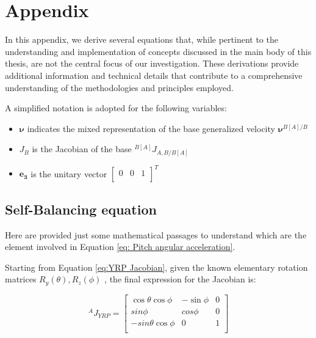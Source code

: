 \chapter{Appendix}
\label{ch:Appendix}%

In this appendix, we derive several equations that, while pertinent to the understanding and implementation of concepts discussed in the main body of this thesis, are not the central focus of our investigation. These derivations provide additional information and technical details that contribute to a comprehensive understanding of the methodologies and principles employed.

A simplified notation is adopted for the following variables:

\begin{itemize}
    \item $\bm{\nu}$ indicates the mixed representation of the base generalized velocity $\bm{\nu}^{B[A]/B}$
    \item $J_{B}$ is the Jacobian of the base ${}^{B[A]} J_{A,B/B[A]}$
    \item $\mathbf{e_{3}}$ is the unitary vector $\begin{bmatrix}
        0 & 0 & 1 \\
    \end{bmatrix}^{T}$
\end{itemize}

\section{Self-Balancing equation}
\label{sec:Self-Balancing equation}

Here are provided just some mathematical passages to understand which are the element involved in Equation \eqref{eq: Pitch angular acceleration}.

Starting from Equation \eqref{eq:YRP Jacobian}, given the known elementary rotation matrices $R_{y}(\theta),R_{z}(\phi)$ \cite{Siciliano-et-al}, the final expression for the Jacobian is:

\begin{equation}
    {}^{A}J_{YRP} = \begin{bmatrix}
        \cos{\theta}\cos{\phi} & -\sin{\phi} & 0 \\
        sin{\phi} & cos{\phi} & 0 \\
        -sin{\theta}\cos{\phi} & 0 & 1 \\
    \end{bmatrix}
\end{equation}

